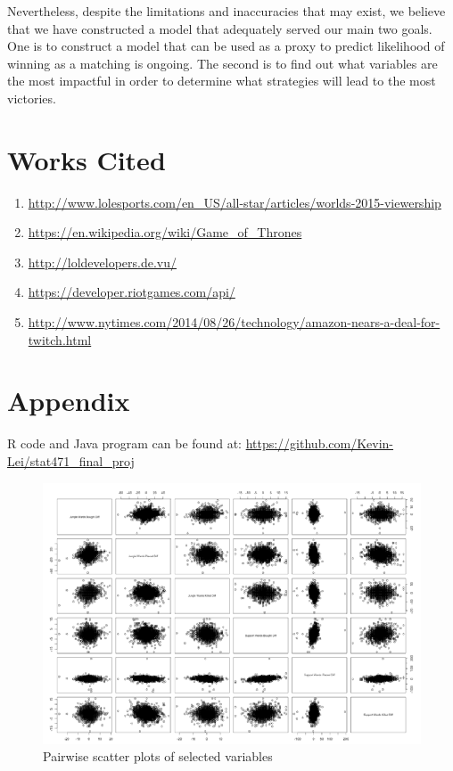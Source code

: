 \documentclass[runningheads]{llncs}
\begin{document}
	Nevertheless, despite the limitations and inaccuracies that may exist, we believe that we have constructed a model that adequately served our main two goals. One is to construct a model that can be used as a proxy to predict likelihood of winning as a matching is ongoing. The second is to find out what variables are the most impactful in order to determine what strategies will lead to the most victories.
	
	\section{Works Cited}

	\begin{enumerate}
		\item[]
		\url{http://www.lolesports.com/en\_US/all-star/articles/worlds-2015-viewership}
		
		\item[]
		\url{https://en.wikipedia.org/wiki/Game\_of\_Thrones}
		
		\item[]
		\url{http://loldevelopers.de.vu/}
		
		\item[]
		\url{https://developer.riotgames.com/api/}
		
		\item[]
		\url{http://www.nytimes.com/2014/08/26/technology/amazon-nears-a-deal-for-twitch.html}
	\end{enumerate}
	
	\section{Appendix}
	R code and Java program can be found at: \url{https://github.com/Kevin-Lei/stat471\_final\_proj}
		
	\begin{figure}
		\centering
		\includegraphics[width=1.0\textwidth]{images/pairwise_scatter.png}
		\caption{Pairwise scatter plots of selected variables}
	\end{figure}
	
  
\end{document}
